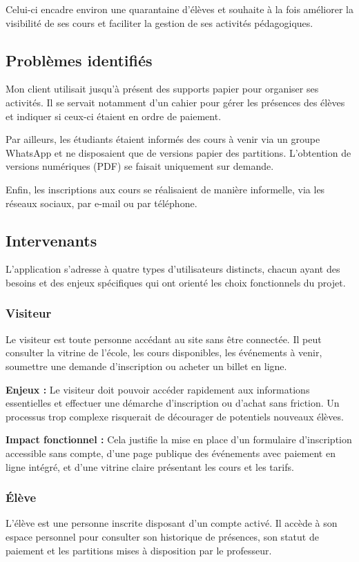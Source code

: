 \documentclass{article}
\begin{document}
Celui-ci encadre environ une quarantaine d’élèves et souhaite à la fois améliorer la visibilité de ses cours et faciliter la gestion de ses activités pédagogiques.


\subsection{Problèmes identifiés}
Mon client utilisait jusqu’à présent des supports papier pour organiser ses activités. Il se servait notamment d’un cahier pour gérer les présences des élèves et indiquer si ceux-ci étaient en ordre de paiement.

Par ailleurs, les étudiants étaient informés des cours à venir via un groupe WhatsApp et ne disposaient que de versions papier des partitions. L’obtention de versions numériques (PDF) se faisait uniquement sur demande.

Enfin, les inscriptions aux cours se réalisaient de manière informelle, via les réseaux sociaux, par e-mail ou par téléphone.

\subsection{Intervenants}

L'application s'adresse à quatre types d'utilisateurs distincts, 
chacun ayant des besoins et des enjeux spécifiques qui ont 
orienté les choix fonctionnels du projet.

\subsubsection{Visiteur}
Le visiteur est toute personne accédant au site sans être 
connectée. Il peut consulter la vitrine de l'école,
les cours disponibles, les événements à venir, soumettre 
une demande d'inscription ou acheter un billet en ligne.

\textbf{Enjeux :} Le visiteur doit pouvoir accéder rapidement 
aux informations essentielles et effectuer une démarche 
d'inscription ou d'achat sans friction. Un processus trop 
complexe risquerait de décourager de potentiels nouveaux élèves.

\textbf{Impact fonctionnel :} Cela justifie la mise en place 
d'un formulaire d'inscription accessible sans compte, d'une 
page publique des événements avec paiement en ligne intégré, 
et d'une vitrine claire présentant les cours et les tarifs.

\subsubsection{Élève}
L'élève est une personne inscrite disposant d'un compte activé. 
Il accède à son espace personnel pour consulter son historique 
de présences, son statut de paiement et les partitions mises 
à disposition par le professeur.
\end{document}
